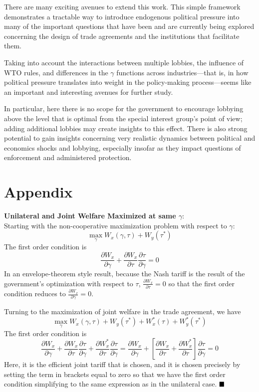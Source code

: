 \documentclass[12pt]{article}
\newcommand{\ga}{\gamma}
\begin{document}
There are many exciting avenues to extend this work. This simple framework demonstrates a tractable way to introduce endogenous political pressure into many of the important questions that have been and are currently being explored concerning the design of trade agreements and the institutions that facilitate them.


Taking into account the interactions between multiple lobbies, the influence of WTO rules, and differences in the $\ga$ functions across industries---that is, in how political pressure translates into weight in the policy-making process---seems like an important and interesting avenues for further study.

In particular, here there is no scope for the government to encourage lobbying above the level that is optimal from the special interest group's point of view; adding additional lobbies may create insights to this effect. There is also strong potential to gain insights concerning very realistic dynamics between political and economics shocks and lobbying, especially insofar as they impact questions of enforcement and administered protection.

\section{Appendix}
\noindent \textbf{\hypertarget{envelope}{Unilateral and Joint Welfare Maximized at same $\ga$}}: \\
Starting with the non-cooperative maximization problem with respect to $\ga$:
\[
 \max_{\ga} W_x(\ga,\tau) + W_y(\tau^*)
\]
The first order condition is
\[
	\frac{\partial W_x}{\partial \ga} + \frac{\partial W_x}{\partial \tau}\frac{\partial \tau}{\partial \ga} = 0
\]
In an envelope-theorem style result, because the Nash tariff is the result of the government's optimization with respect to $\tau$, $\frac{\partial W_x}{\partial \tau}=0$ so that the first order condition reduces to $\frac{\partial W_x}{\partial \ga} = 0$.
				
Turning to the maximization of joint welfare in the trade agreement, we have
\[
  \max_{\ga} W_x(\ga,\tau) + W_y(\tau^*) + W_x^*(\tau)+ W_y^*(\tau^*)
\]
The first order condition is 
\[
  \frac{\partial W_x}{\partial \ga} + \frac{\partial W_x}{\partial \tau}\frac{\partial \tau}{\partial \ga} + \frac{\partial W_x^*}{\partial \tau}\frac{\partial \tau}{\partial \ga} = \frac{\partial W_x}{\partial \ga} + \left[ \frac{\partial W_x}{\partial \tau} + \frac{\partial W_x^*}{\partial \tau}\right]\frac{\partial \tau}{\partial \ga} = 0
\]
Here, it is the efficient joint tariff that is chosen, and it is chosen precisely by setting the term in brackets equal to zero so that we have the first order condition simplifying to the same expression as in the unilateral case. $\hfill\blacksquare$
\end{document}
